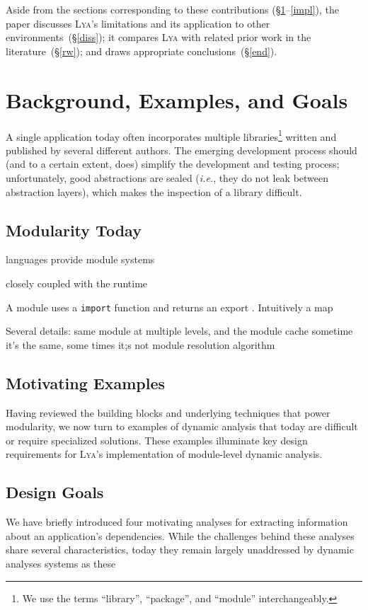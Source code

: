 \documentclass[letterpaper,twocolumn,10pt]{article}
\def\ie{{\em i.e.}, }
\newcommand{\ttt}[1]{\texttt{#1}}
\newcommand{\sx}[1]{(\S\ref{#1})}
\newcommand{\sys}{{\scshape Lya}\xspace}
\begin{document}
Aside from the sections corresponding to these contributions (\S\ref{bg}--\ref{impl}), the paper discusses \sys's limitations and its application to other environments~\sx{diss};
   it compares \sys with related prior work in the literature~\sx{rw}; and draws appropriate conclusions~\sx{end}.


\section{Background, Examples, and Goals}
\label{bg}

A single application today often incorporates multiple libraries\footnote{We use the terms ``library'', ``package'', and ``module'' interchangeably.} written and published by several different authors.
The emerging development process should (and to a certain extent, does) simplify the development and testing process;
  unfortunately, good abstractions are sealed (\ie they do not leak between abstraction layers), which makes the inspection of a library difficult.

\subsection{Modularity Today}

languages provide module systems

closely coupled with the runtime

A module uses a \ttt{import} function and returns an export .
Intuitively a map

Several details:
  same module at multiple levels, and the module cache
  sometime it's the same, some times it;s not
  module resolution algorithm

\subsection{Motivating Examples}

Having reviewed the building blocks and underlying techniques that power modularity, we now turn to examples of dynamic analysis that today are difficult or require specialized solutions. These examples illuminate key design requirements for \sys's implementation of module-level dynamic analysis.

\subsection{Design Goals}

We have briefly introduced four motivating analyses for extracting information about an application's dependencies.
While the challenges behind these analyses share several characteristics, today they remain largely unaddressed by dynamic analyses systems as these 
\end{document}
